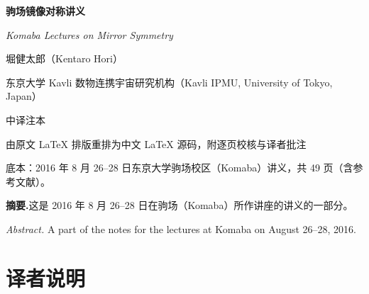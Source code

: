 
\begin{titlepage}
\centering
\vspace*{3.2cm}

{\LARGE\bfseries 驹场镜像对称讲义\par}
\vspace{1.0cm}
{\Large\itshape Komaba Lectures on Mirror Symmetry\par}
\vspace{2.2cm}
{\Large 堀健太郎（Kentaro Hori）\par}
\vspace{0.6cm}
{\large 东京大学 Kavli 数物连携宇宙研究机构（Kavli IPMU, University of Tokyo, Japan）\par}
\vspace{3.2cm}
{\large 中译注本\par}
\vspace{0.4cm}
{\normalsize 由原文 LaTeX 排版重排为中文 \LaTeX{} 源码，附逐页校核与译者批注\par}
\vfill
{\small 底本：2016 年 8 月 26--28 日东京大学驹场校区（Komaba）讲义，共 49 页（含参考文献）。\par}
\vspace{0.4cm}
\end{titlepage}

\begin{center}
\begin{minipage}{0.92\textwidth}
\small
\noindent\textbf{摘要.}\quad 这是 2016 年 8 月 26--28 日在驹场（Komaba）所作讲座的讲义的一部分。

\medskip
\noindent\textit{Abstract.} A part of the notes for the lectures at Komaba on August 26--28, 2016.
\end{minipage}
\end{center}

\vspace{1.0cm}

\section*{译者说明}

